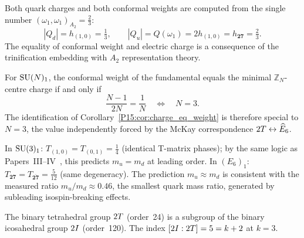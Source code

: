 \begin{corollary}
\label{P15:cor:charge_eq_weight}
Both quark charges and both conformal weights are computed from the
single number $(\omega_1,\omega_1)_{A_2}=\tfrac23$:
\begin{equation}
  \boxed{|Q_d| = h_{(1,0)} = \tfrac13,
  \qquad
  |Q_u| = Q(\omega_1) = 2h_{(1,0)} = h_{\mathbf{27}} = \tfrac23.}
  \label{P15:eq:charge_eq_weight}
\end{equation}
The equality of conformal weight and electric charge is a consequence
of the trinification embedding with $A_2$ representation theory.
\end{corollary}

\begin{remark}[Why $N=3$ is essential]
\label{P15:rem:N3_unique}
For $\mathrm{SU}(N)_1$, the conformal weight of the fundamental equals the
minimal $\mathbb{Z}_N$-centre charge if and only if
\begin{equation}
  \frac{N-1}{2N}=\frac{1}{N}
  \quad\Longleftrightarrow\quad
  N=3.
  \label{P15:eq:N3unique}
\end{equation}
The identification of Corollary~\ref{P15:cor:charge_eq_weight} is therefore
special to $N=3$, the value independently forced by the McKay
correspondence $2T\leftrightarrow\widehat{E}_6$.
\end{remark}

\begin{remark}
\label{P15:rem:leading_order_mass_degeneracy}
In $\mathrm{SU}(3)_1$: $T_{(1,0)}=T_{(0,1)}=\tfrac{1}{4}$ (identical
T-matrix phases); by the same logic as Papers~III--IV~\cite{Paper3,Paper4},
this predicts $m_u=m_d$ at leading order.
In $(E_6)_1$: $T_{\mathbf{27}}=T_{\overline{\mathbf{27}}}=\tfrac{5}{12}$
(same degeneracy).
The prediction $m_u\approx m_d$ is consistent with the measured
ratio $m_u/m_d\approx0.46$, the smallest quark mass ratio,
generated by subleading isospin-breaking effects.
\end{remark}

\begin{theorem}[$\twoT\subset\twoI$]
\label{P15:thm:subgroup}
The binary tetrahedral group $2T$ (order~24) is a subgroup of
the binary icosahedral group $2I$ (order~120).
The index $[2I:2T]=5=k+2$ at $k=3$.
\end{theorem}


